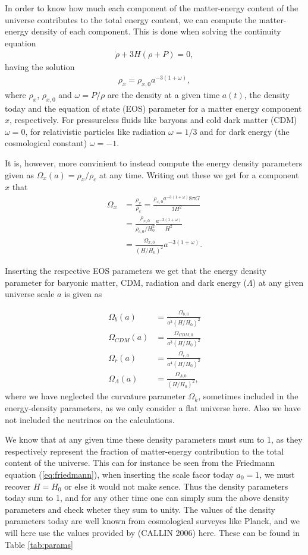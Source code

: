 \documentclass[twocolumn]{aastex62}
\begin{document}
In order to know how much each component of the matter-energy content of the
universe contributes to the total energy content, we can compute the
matter-energy density of each component. This is done when solving the
continuity equation 
\begin{align}
    \dot{\rho} + 3H(\rho + P) = 0,
\end{align}
having the solution 
\begin{align}
    \rho_{x} = \rho_{x,0} a^{-3(1+\omega)},
\end{align}
where $\rho_x$, $\rho_{x,0}$ and $\omega = P/\rho$ are the density at a given
time $a(t)$, the density today and the equation of state (EOS) parameter for a
matter energy component $x$, respectively. For pressureless fluids like baryons
and cold dark matter (CDM) $\omega = 0$, for relativistic particles like
radiation $\omega = 1/3$ and for dark energy (the cosmological constant) $\omega
= -1$. 

It is, however, more convinient to instead compute the energy density parameters
given as 
$\Omega_x(a) = \rho_x / \rho_c$ at any time. Writing out these we get for a
component $x$ that 
\begin{align}
    \Omega_x &= \frac{\rho_x}{\rho_c} = \frac{\rho_{x,0}a^{-3(1+\omega)} 8\pi G}{3 H^2} \\
   &= \frac{\rho_{x,0}}{\rho_{c,0}/H_0^2} \frac{a^{-3(1+\omega)}}{H^2} \\ 
   &= \frac{\Omega_{x,0}}{(H/H_0)^2} a^{-3(1+\omega)}.
\end{align}

Inserting the respective EOS parameters we get that the energy density parameter
for baryonic matter, CDM, radiation and dark energy ($\Lambda$)
at any given universe scale $a$ is given as

\begin{align}
    \Omega_b(a) &= \frac{\Omega_{b,0}}{a^3 (H/H_0)^2}\\
    \Omega_{CDM}(a) &= \frac{\Omega_{CDM,0}}{a^3 (H/H_0)^2}\\
    \Omega_r(a) &= \frac{\Omega_{r,0}}{a^4 (H/H_0)^2}\\
    \Omega_\Lambda(a) &= \frac{\Omega_{\Lambda,0}}{(H/H_0)^2},
\end{align}
where we have neglected the curvature parameter $\Omega_k$, sometimes included in
the energy-density parameters, as we only consider a flat universe here. Also we
have not included the neutrinos on the calculations. 

We know that at any given time these density parameters must sum to 1, as they
respectively represent the fraction of matter-energy contribution to the total
content of the universe. This can for instance be seen from the Friedmann
equation (\ref{eq:friedmann}), when inserting the scale facor today $a_0 = 1$,
we must recover $H = H_0$ or else it would not make sence. Thus the density
parameters today sum to 1, and for any other time one can simply sum the above
density parameters and check wheter they sum to unity.
The values of the density parameters today are well known from cosmological
surveyes like Planck, and we will here use the values provided by (CALLIN 2006)
here. These can be found in Table \ref{tab:params}
\end{document}
